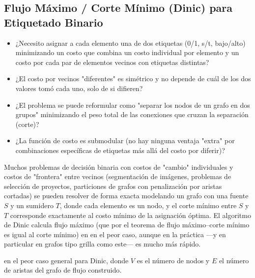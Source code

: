 \subsection{Flujo Máximo / Corte Mínimo (Dinic) para Etiquetado Binario}


\begin{itemize}
\item ¿Necesito asignar a cada elemento una de dos etiquetas (0/1, s/t, bajo/alto) minimizando un costo que combina un costo individual por elemento y un costo por cada par de elementos vecinos con etiquetas distintas?
\item ¿El costo por vecinos "diferentes" es simétrico y no depende de cuál de los dos valores tomó cada uno, solo de si difieren?
\item ¿El problema se puede reformular como "separar los nodos de un grafo en dos grupos" minimizando el peso total de las conexiones que cruzan la separación (corte)?
\item ¿La función de costo es submodular (no hay ninguna ventaja "extra" por combinaciones específicas de etiquetas más allá del costo por diferir)?
\end{itemize}

 Muchos problemas de decisión binaria con costos de "cambio" individuales y costos de "frontera" entre vecinos (segmentación de imágenes, problemas de selección de proyectos, particiones de grafos con penalización por aristas cortadas) se pueden resolver de forma exacta modelando un grafo con una fuente $S$ y un sumidero $T$, donde cada elemento es un nodo, y el corte mínimo entre $S$ y $T$ corresponde exactamente al costo mínimo de la asignación óptima. El algoritmo de Dinic calcula flujo máximo (que por el teorema de flujo máximo–corte mínimo es igual al corte mínimo) en  en el peor caso, aunque en la práctica —y en particular en grafos tipo grilla como este— es mucho más rápido.

  en el peor caso general para Dinic, donde $V$ es el número de nodos y $E$ el número de aristas del grafo de flujo construido.

